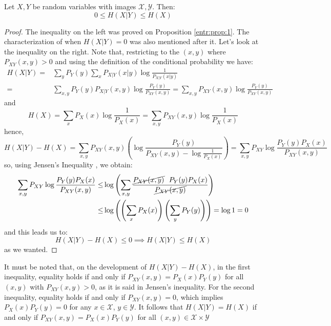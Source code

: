 \begin{nprop}\label{entr:prop:2}
Let $X,Y$ be random variables with images $\mathcal X, \mathcal Y$. Then:
$$
0 \leq H(X|Y) \leq H(X)
$$
\end{nprop}
\begin{proof}

The inequality on the left was proved on Proposition \ref{entr:prop:1}. The characterization of when $H(X|Y) = 0$ was also mentioned after it.  Let's look at the inequality on the right. Note that, restricting to the $(x,y)$ where $P_{XY}(x,y) > 0$ and using the definition of the conditional probability we have:
\begin{align*}
H(X|Y) = & \sum_y P_Y(y) \sum_x P_{X|Y}(x|y)\log \frac{1}{P_{X|Y}(x|y)}\\ = & \sum_{x,y} P_Y(y) P_{X|Y}(x,y) \log \frac{P_Y(y)}{P_{XY}(x,y)} = \sum_{x,y} P_{XY}(x,y)\log \frac{P_Y(y)}{P_{XY}(x,y)} 
\end{align*}
and 
$$
H(X) = \sum_x P_X(x) \log \frac{1}{P_X(x)} = \sum_{x,y}P_{XY}(x,y) \log \frac{1}{P_X(x)}
$$
hence,
$$
H(X|Y) - H(X) = \sum_{x,y}P_{XY}(x,y) \left( \log \frac{P_Y(y)}{P_{XY}(x,y) - \log \frac{1}{P_X(x)}}\right) = \sum_{x,y}P_{XY}\log \frac{P_Y(y)P_X(x)}{P_{XY}(x,y)}
$$
so, using Jensen's Inequality , we obtain:
\begin{align*}
\sum_{x,y}P_{XY}\log \frac{P_Y(y)P_X(x)}{P_{XY}(x,y)} \leq & \log \left( \sum_{x,y}\frac{ \cancel{P_{XY}(x,y)} \ \  P_Y(y) P_X(x)}{\cancel{P_{XY}(x,y)}} \right) \\ \leq & \log\left( \left( \sum_x P_X(x) \right) \left(\sum_y P_Y(y)\right)\right) = \log 1 = 0
\end{align*}
and this leads us to:
$$
H(X|Y) - H(X) \leq 0 \implies H(X|Y) \leq H(X)
$$
as we wanted.
\end{proof}

It must be noted that, on the development of $H(X|Y) - H(X)$, in the first inequality, equality holds if and only if $P_{XY}(x,y) = P_X(x) P_Y(y)$ for all $(x,y)$ with $P_{XY} (x,y) > 0$, as it is said in Jensen's inequality. For the second inequality, equality holds if and only if $P_{XY}(x,y) = 0$, which implies $P_X(x)P_Y(y) = 0$ for any $x\in \mathcal X$, $y \in \mathcal Y$. It follows that $H(X|Y) = H(X)$ if and only if $P_{XY}(x,y) = P_X(x)P_Y(y)$ for all $(x,y) \in \mathcal X \times \mathcal Y$


